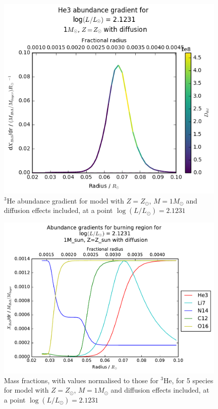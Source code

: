 \documentclass[12pt, a4paper]{report}
\begin{document}
\begin{figure}
\begin{center}
\includegraphics[scale=0.6]{../mu_test_data/mu_test_graphs/eq_logL=2p1231_He3_radius_gradient_Dthl_color.png}
\caption{$^{3}$He abundance gradient for model with $Z = Z_{\odot}$, $M = 1M_{\odot}$ and diffusion effects included, at a point $\log(L/L_{\odot}) = 2.1231$}
\label{dHe3/dr_colour}
\end{center}
\end{figure}

\begin{figure}
\begin{center}
\includegraphics[scale=0.5]{../mu_test_data/mu_test_graphs/burning_logL=2p1231_5species.pdf}
\caption{Mass fractions, with values normalised to those for $^{3}$He, for 5 species for model with $Z = Z_{\odot}$, $M = 1M_{\odot}$ and diffusion effects included, at a point $\log(L/L_{\odot}) = 2.1231$}
\label{5specs_norm}
\end{center}
\end{figure}
\end{document}
